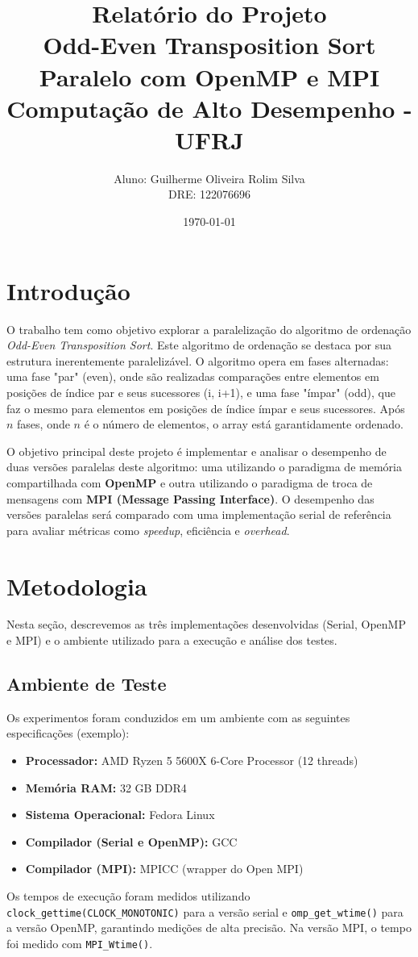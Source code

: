 \documentclass[12pt, a4paper]{article}
\title{
    \textbf{Relatório do Projeto} \\
    \vspace{0.2cm}
    \large Odd-Even Transposition Sort Paralelo com OpenMP e MPI \\
    \large Computação de Alto Desempenho - UFRJ
}
\author{
    Aluno: Guilherme Oliveira Rolim Silva \\
    DRE: 122076696
}
\date{\today}
\begin{document}
\maketitle
\thispagestyle{empty}

\section{Introdução}

O trabalho tem como objetivo explorar a paralelização do algoritmo de ordenação \textit{Odd-Even Transposition Sort}. Este algoritmo de ordenação se destaca por sua estrutura inerentemente paralelizável. O algoritmo opera em fases alternadas: uma fase "par" (even), onde são realizadas comparações entre elementos em posições de índice par e seus sucessores (i, i+1), e uma fase "ímpar" (odd), que faz o mesmo para elementos em posições de índice ímpar e seus sucessores. Após $n$ fases, onde $n$ é o número de elementos, o array está garantidamente ordenado.

O objetivo principal deste projeto é implementar e analisar o desempenho de duas versões paralelas deste algoritmo: uma utilizando o paradigma de memória compartilhada com \textbf{OpenMP} e outra utilizando o paradigma de troca de mensagens com \textbf{MPI (Message Passing Interface)}. O desempenho das versões paralelas será comparado com uma implementação serial de referência para avaliar métricas como \textit{speedup}, eficiência e \textit{overhead}.

\section{Metodologia}

Nesta seção, descrevemos as três implementações desenvolvidas (Serial, OpenMP e MPI) e o ambiente utilizado para a execução e análise dos testes.

\subsection{Ambiente de Teste}
Os experimentos foram conduzidos em um ambiente com as seguintes especificações (exemplo):
\begin{itemize}
    \item \textbf{Processador:} AMD Ryzen 5 5600X 6-Core Processor (12 threads)
    \item \textbf{Memória RAM:} 32 GB DDR4
    \item \textbf{Sistema Operacional:} Fedora Linux
    \item \textbf{Compilador (Serial e OpenMP):} GCC
    \item \textbf{Compilador (MPI):} MPICC (wrapper do Open MPI)
\end{itemize}
Os tempos de execução foram medidos utilizando \texttt{clock\_gettime(CLOCK\_MONOTONIC)} para a versão serial e \texttt{omp\_get\_wtime()} para a versão OpenMP, garantindo medições de alta precisão. Na versão MPI, o tempo foi medido com \texttt{MPI\_Wtime()}.
\end{document}
